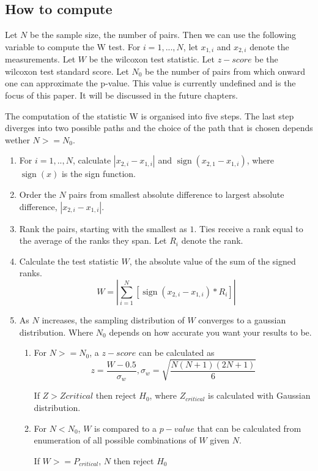 \documentclass[12pt]{article}
\DeclareMathOperator{\sign}{sign}
\begin{document}
\subsection{How to compute}
Let $N$ be the sample size, the number of pairs. Then we can use the following variable to compute the W test. For $i=1,...,N$, let $x_{1, i}$ and $x_{2, i}$ denote the measurements.
Let $W$ be the wilcoxon test statistic.
Let $z-score$ be the wilcoxon test standard score.
Let $N_0$ be the number of pairs from which onward one can approximate the p-value. This value is currently undefined and is the focus of this paper. It will be discussed in the future chapters.

The computation of the statistic W is organised into five steps. The last step diverges into two possible paths and the choice of the path that is chosen depends wether $N  >= N_0$.

\begin{enumerate}
\item
For $i=1, .., N$, calculate $|x_{2,i} - x_{1,i}|$ and $\sign(x_{2,1} - x_{1,i})$, where $\sign(x)$ is the sign function.
\item
Order the $N$ pairs from smallest absolute difference to largest absolute difference, $|x_{2,i} - x_{1,i}|$.
\item
Rank the pairs, starting with the smallest as $1$. Ties receive a rank equal to the average of the ranks they span. Let $R_i$ denote the rank.
\item
Calculate the test statistic $W$, the absolute value of the sum of the signed ranks.
\begin{equation}
  W=|\sum\limits_{i=1}^{N} [\sign(x_{2,i} - x_{1,i})*R_i]|
\end{equation}

\item
As $N$ increases, the sampling distribution of $W$ converges to a gaussian distribution. Where $N_0$ depends on how accurate you want your results to be.
\begin{enumerate}
\item
For $N >= N_0$, a $z-score$ can be calculated as
\begin{equation}
  z=\frac{W-0.5}{\sigma_w},\sigma_w = \sqrt{\frac{N(N + 1)(2N + 1)}{6}}
\end{equation}

If $Z > Zcritical$ then reject $H_0$, where $Z_{critical}$ is calculated with Gaussian distribution.

\item
For $N < N_0$, $W$  is compared to a $p-value$ that can be calculated from enumeration of all possible combinations of $W$ given $N$.

If $W >= P_{critical}$, $N$ then reject $H_0$
\end{enumerate}
\end{enumerate}
\end{document}
